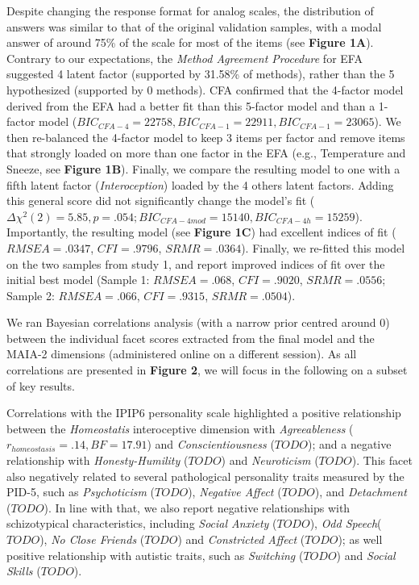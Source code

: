 \documentclass[
  man,floatsintext]{apa6}
\begin{document}
Despite changing the response format for analog scales, the distribution of answers was similar to that of the original validation samples, with a modal answer of around 75\% of the scale for most of the items (see \textbf{Figure 1A}). Contrary to our expectations, the \emph{Method Agreement Procedure} for EFA suggested 4 latent factor (supported by 31.58\% of methods), rather than the 5 hypothesized (supported by 0 methods). CFA confirmed that the 4-factor model derived from the EFA had a better fit than this 5-factor model and than a 1-factor model (\(BIC_{CFA-4} = 22758, BIC_{CFA-1} = 22911, BIC_{CFA-1} = 23065\)). We then re-balanced the 4-factor model to keep 3 items per factor and remove items that strongly loaded on more than one factor in the EFA (e.g., Temperature and Sneeze, see \textbf{Figure 1B}). Finally, we compare the resulting model to one with a fifth latent factor (\emph{Interoception}) loaded by the 4 others latent factors. Adding this general score did not significantly change the model's fit (\(\Delta \chi^2(2) = 5.85, p = .054; BIC_{CFA-4mod} = 15140, BIC_{CFA-4h} = 15259\)). Importantly, the resulting model (see \textbf{Figure 1C}) had excellent indices of fit (\(RMSEA = .0347\), \(CFI = .9796\), \(SRMR = .0364\)). Finally, we re-fitted this model on the two samples from study 1, and report improved indices of fit over the initial best model (Sample 1: \(RMSEA = .068\), \(CFI = .9020\), \(SRMR = .0556\); Sample 2: \(RMSEA = .066\), \(CFI = .9315\), \(SRMR = .0504\)).

We ran Bayesian correlations analysis (with a narrow prior centred around 0)
between the individual facet scores extracted from the final model and the MAIA-2 dimensions (administered online on a different session). As all correlations are presented in \textbf{Figure 2}, we will focus in the following on a subset of key results.

Correlations with the IPIP6 personality scale highlighted a positive relationship between the \emph{Homeostatis} interoceptive dimension with \emph{Agreeableness} (\(r_{homeostasis} = .14, BF = 17.91\)) and \emph{Conscientiousness} (\(TODO\)); and a negative relationship with \emph{Honesty-Humility} (\(TODO\)) and \emph{Neuroticism} (\(TODO\)). This facet also negatively related to several pathological personality traits measured by the PID-5, such as \emph{Psychoticism} (\(TODO\)), \emph{Negative Affect} (\(TODO\)), and \emph{Detachment} (\(TODO\)). In line with that, we also report negative relationships with schizotypical characteristics, including \emph{Social Anxiety} (\(TODO\)), \emph{Odd Speech}(\(TODO\)), \emph{No Close Friends} (\(TODO\)) and \emph{Constricted Affect} (\(TODO\)); as well positive relationship with autistic traits, such as \emph{Switching} (\(TODO\)) and \emph{Social Skills} (\(TODO\)).
\end{document}
